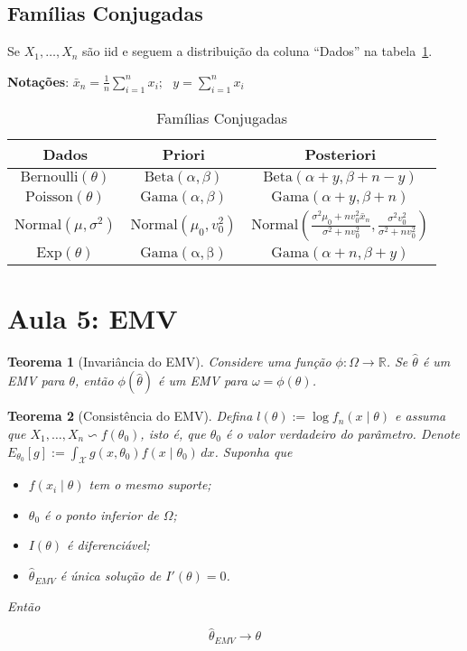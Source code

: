 \documentclass{article}
\newtheorem{theorem}{Teorema}
\begin{document}
\subsection*{Famílias Conjugadas}

Se $X_1,\ldots,X_n$ são iid e seguem a distribuição da coluna ``Dados'' na tabela~\ref{tab:1}.

\textbf{Notações}: $\bar {x}_n= \frac{1}{n}\sum_{i=1}^n x_i;~~~
y=\sum_{i=1}^nx_i$
\begin{table}[!htb]
    \centering
    \begin{tabular}{|c|c|c|}
        \hline \textbf{Dados} & \textbf{Priori} & \textbf{Posteriori}\\ \hline
         $\mathrm{Bernoulli}(\theta)$&$\mathrm{Beta}(\alpha,\beta)$ & $\mathrm{Beta}(\alpha+y,\beta+n-y)$ \\ \hline
         $\mathrm{Poisson}(\theta)$&$\mathrm{Gama}(\alpha,\beta)$&$\mathrm{Gama}(\alpha+y,\beta+n)$\\ \hline 
         $\mathrm{Normal}(\mu,\sigma^2)$ & $\mathrm{Normal}(\mu_0,v_0^2)$& $\mathrm{Normal}\left(\frac{\sigma^2\mu_0+nv_0^2\bar{x}_n}{\sigma^2+nv_0^2},\frac{\sigma^2v_0^2}{\sigma^2+nv_0^2}\right)$ \\ \hline
         $\mathrm{Exp}(\theta)$ &$\mathrm{Gama(\alpha,\beta)}$ & $\mathrm{Gama}(\alpha+n,\beta+y)$ \\ \hline

    \end{tabular}
    \caption{Famílias Conjugadas}\label{tab:1}
\end{table}

\section*{Aula 5: EMV}

\begin{theorem}[Invariância do EMV]
Considere uma função $\phi: \Omega \rightarrow \mathbb{R}$. Se $\hat{\theta}$ é um EMV para $\theta$, então $\phi(\hat{\theta})$ é um EMV para $\omega = \phi(\theta)$.
\end{theorem}

\begin{theorem}[Consistência do EMV]
Defina $l(\theta) := \log f_n(x \mid \theta)$ e assuma que $X_1, \ldots, X_n \backsim f(\theta_0)$, isto é, que $\theta_0$ é o valor verdadeiro do parâmetro.
Denote $E_{\theta_0}[g] := \int_{\mathcal{X}} g(x, \theta_0) f(x \mid \theta_0)\, dx$. Suponha que

\begin{itemize}
    \item $f(x_i \mid \theta)$ tem o mesmo suporte;
    \item $\theta_0$ é o ponto inferior de $\Omega$;
    \item $I(\theta)$ é diferenciável;
    \item $\hat{\theta}_{EMV}$ é única solução de $I'(\theta) = 0$.
\end{itemize}

Então

$$\hat{\theta}_{EMV} \rightarrow \theta$$

\end{theorem}
\end{document}
